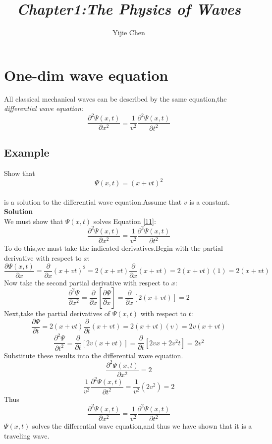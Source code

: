 \documentclass[12pt]{article}
\title{\emph{Chapter1:The Physics of Waves}}
\author{Yijie Chen}
\date{}
\numberwithin{equation}{section}
\begin{document}
\maketitle
\tableofcontents
\newpage
\section{One-dim wave equation}
    \indent All classical mechanical waves can be described by the same equation,the \emph{differential wave equation:}
    \begin{equation}
        \frac{\partial^2{\Psi(x,t)}}{\partial{x^2}}=\frac{1}{v^2}\frac{\partial^2{\Psi(x,t)}}{\partial{t^2}}\label{11}
    \end{equation}
\subsection{Example}
    Show that
    \\
    \[\Psi(x,t)=(x+vt)^2\]
    \\
    is a solution to the differential wave equation.Assume that $v$ is a constant.\\
    \indent \textbf{Solution}\\
    \indent  We must show that $\Psi(x,t)$ solves Equation \eqref{11}:
    \[
    \frac{\partial^2{\Psi(x,t)}}{\partial{x^2}}=\frac{1}{v^2}\frac{\partial^2{\Psi(x,t)}}{\partial{t^2}}
    \]
    \indent To do this,we must take the indicated derivatives.Begin with the partial derivative with respect to $x$:
    \[
    \frac{\partial{\Psi(x,t)}}{\partial{x}}=\frac{\partial}{\partial{x}}(x+vt)^2=2(x+vt)\frac{\partial}{\partial{x}}(x+vt)=2(x+vt)(1)=2(x+vt)
    \]
    \indent Now take the second partial derivative with respect to $x$:
    \[
    \frac{\partial^2{\Psi}}{\partial{x^2}}=\frac{\partial}{\partial{x}}[\frac{\partial{\Psi}}{\partial{x}}]=\frac{\partial}{\partial{x}}[2(x+vt)]=2
    \]
    \indent Next,take the partial derivatives of $\Psi(x,t)$ with respect to $t$:
    \[
    \frac{\partial{\Psi}}{\partial{t}}=2(x+vt)\frac{\partial}{\partial{t}}(x+vt)=2(x+vt)(v)=2v(x+vt)
    \]
    \[
    \frac{\partial^2{\Psi}}{\partial{t^2}}=\frac{\partial}{\partial{t}}[2v(x+vt)]=\frac{\partial}{\partial{t}}[2vx+2v^2t]=2v^2
    \]
    \indent Substitute these results into the differential wave equation.
    \[
    \frac{\partial^2{\Psi(x,t)}}{\partial{x^2}}=2
    \]
    \[
    \frac{1}{v^2}\frac{\partial^2{\Psi(x,t)}}{\partial{t^2}}=\frac{1}{v^2}(2v^2)=2
    \]
    \indent Thus
    \[
    \frac{\partial^2{\Psi(x,t)}}{\partial{x^2}}=\frac{1}{v^2}\frac{\partial^2{\Psi(x,t)}}{\partial{t^2}}
    \]
    \indent $\Psi(x,t)$ solves the differential wave equation,and thus we have shown that it is a traveling wave.
\end{document}
